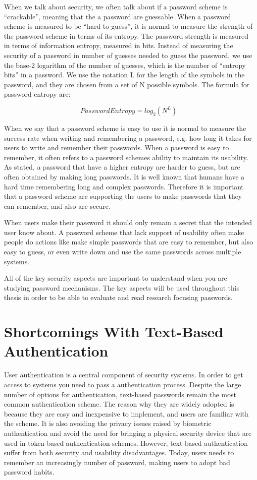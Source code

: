   When we talk about security, we often talk about if a password scheme is ``crackable'', meaning that the a password are guessable. When a password scheme is measured to be ``hard to guess'', it is normal to measure the strength of the password scheme in terms of its entropy. The password strength is measured in terms of information entropy, measured in bits. Instead of measuring the security of a password in number of guesses needed to guess the password, we use the base-2 logarithm of the number of guesses, which is the number of ``entropy bits'' in a password. We use the notation L for the length of the symbols in the password, and they are chosen from a set of N possible symbols. The formula for password entropy are:

    \begin{equation}
      Password Entropy = log_{2}(N^{L})
    \end{equation}

  When we say that a password scheme is easy to use it is normal to measure the success rate when writing and remembering a password, e.g. how long it takes for users to write and remember their passwords. When a password is easy to remember, it often refers to a password schemes ability to maintain its usability. As stated, a password that have a higher entropy are harder to guess, but are often obtained by making long passwords. It is well known that humans have a hard time remembering long and complex passwords. Therefore it is important that a password scheme are supporting the users to make passwords that they can remember, and also are secure. 

  When users make their password it should only remain a secret that the intended user know about. A password scheme that lack support of usability often make people do actions like make simple passwords that are easy to remember, but also easy to guess, or even write down and use the same passwords across multiple systems. 

  All of the key security aspects are important to understand when you are studying password mechanisms. The key aspects will be used throughout this thesis in order to be able to evaluate and read research focusing passwords. 

  \section{Shortcomings With Text-Based Authentication} 
  User authentication is a central component of security systems. In order to get access to systems you need to pass a authentication process. Despite the large number of options for authentication, text-based passwords remain the most common authentication scheme. The reason why they are widely adopted is because they are easy and inexpensive to implement, and users are familiar with the scheme. It is also avoiding the privacy issues raised by biometric authentication and avoid the need for bringing a physical security device that are used in token-based authentication schemes. However, text-based authentication suffer from both security and usability disadvantages. Today, users needs to remember an increasingly number of password, making users to adopt bad password habits. 

